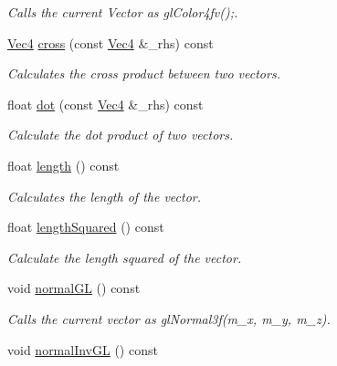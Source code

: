 \begin{DoxyCompactItemize}
\begin{DoxyCompactList}\small\item\em Calls the current Vector as glColor4fv();. \item\end{DoxyCompactList}\item 
\hyperlink{classVec4}{Vec4} \hyperlink{classVec4_a5a2139b9f193e528e8f9bee0d0a14652}{cross} (const \hyperlink{classVec4}{Vec4} \&\_\-rhs) const 
\begin{DoxyCompactList}\small\item\em Calculates the cross product between two vectors. \item\end{DoxyCompactList}\item 
float \hyperlink{classVec4_a91498b8d3af850201aababdeb523c58e}{dot} (const \hyperlink{classVec4}{Vec4} \&\_\-rhs) const 
\begin{DoxyCompactList}\small\item\em Calculate the dot product of two vectors. \item\end{DoxyCompactList}\item 
float \hyperlink{classVec4_a08573e03357a6d14294da98c46cbab58}{length} () const 
\begin{DoxyCompactList}\small\item\em Calculates the length of the vector. \item\end{DoxyCompactList}\item 
float \hyperlink{classVec4_ae2413a4eb232a55f15bafa13e49e75b7}{lengthSquared} () const 
\begin{DoxyCompactList}\small\item\em Calculate the length squared of the vector. \item\end{DoxyCompactList}\item 
\hypertarget{classVec4_aefca6527cea99964c2075a02de8b341d}{
void \hyperlink{classVec4_aefca6527cea99964c2075a02de8b341d}{normalGL} () const }
\label{classVec4_aefca6527cea99964c2075a02de8b341d}

\begin{DoxyCompactList}\small\item\em Calls the current vector as glNormal3f(m\_\-x, m\_\-y, m\_\-z). \item\end{DoxyCompactList}\item 
\hypertarget{classVec4_a09551d165456d7fcff73bf96118790f3}{
void \hyperlink{classVec4_a09551d165456d7fcff73bf96118790f3}{normalInvGL} () const }
\label{classVec4_a09551d165456d7fcff73bf96118790f3}


\end{DoxyCompactItemize}
